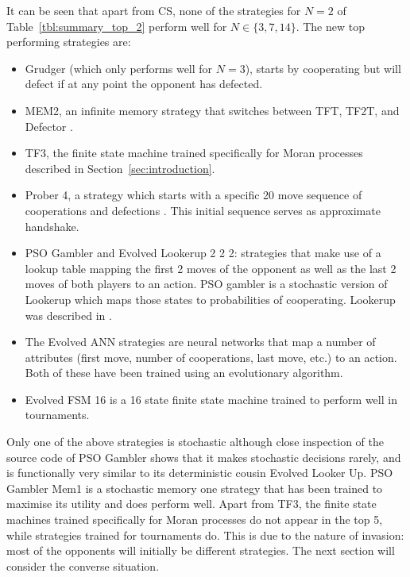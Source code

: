 \documentclass[10pt,journal]{IEEEtran}
\begin{document}
It can be seen that apart from CS, none of the strategies for \(N=2\)
of Table~\ref{tbl:summary_top_2} perform well for \(N\in\{3, 7, 14\}\). The new
top performing strategies are:

\begin{itemize}
    \item Grudger (which only performs well for \(N=3\)), starts by cooperating
        but will defect if at any point the opponent has defected.
    \item MEM2, an infinite memory strategy that switches between TFT, TF2T, and
        Defector \cite{Li2014}.
    \item TF3, the finite state machine trained specifically for Moran processes
        described in Section~\ref{sec:introduction}.
    \item Prober 4, a strategy which starts with a specific 20 move sequence of
        cooperations and defections \cite{Prison1998}. This initial sequence serves
        as approximate handshake.
    \item  PSO Gambler and Evolved Lookerup 2 2 2: strategies that make use
        of a lookup table mapping the first 2 moves of the opponent as well as
        the last 2 moves of both players to an action.  PSO gambler is a
        stochastic version of  Lookerup which maps those states to probabilities
       of cooperating. Lookerup was described in \cite{Knight2016}.
    \item The Evolved ANN strategies are neural networks that map a number of
	    attributes (first move, number of cooperations, last move, etc.) to
	    an action. Both of these have been trained using an evolutionary
	    algorithm.
    \item Evolved FSM 16 is a 16 state finite state machine trained to
        perform well in tournaments.
\end{itemize}

Only one of the above strategies is stochastic although close inspection of the
source code of PSO Gambler shows that it makes stochastic decisions rarely, and
is functionally very similar to its deterministic cousin Evolved Looker Up.
PSO Gambler Mem1 is a stochastic memory one strategy that has been trained to
maximise its utility and does perform well.
Apart from TF3, the finite state machines trained specifically for
Moran processes do not appear in the top 5, while strategies trained for
tournaments do. This is due to the nature of invasion: most of the opponents
will initially be different strategies. The next section will consider the
converse situation.
\end{document}
